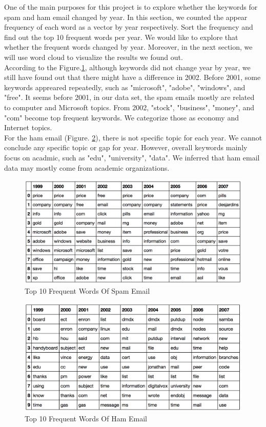 
One of the main purposes for this project is to explore whether the keywords for spam and ham email changed by year. In this section, we counted the appear frequency of each word as a vector by year respectively. Sort the frequency and find out the top 10 frequent words per year. We would like to explore that whether the frequent words changed by year. Moreover, in the next section, we will use word cloud to visualize the results we found out.\\

According to the Figure.\ref{topwordspam}, although keywords did not change year by year, we still have found out that there might have a difference in 2002. Before 2001, some keywords appreared repeatedly, such as "microsoft", "adobe", "windows", and "free". It seems before 2001, in our data set, the spam emails mostly are related to computer and Microsoft topics. From 2002, "stock", "business", "money", and  "com" become top frequent keywords. We categorize those as economy and Internet topics. \\

For the ham email (Figure. \ref{topwordham}), there is not specific topic for each year. We cannot conclude any specific topic or gap for year. However, overall keywords mainly focus on acadmic, such as "edu", "university", "data". We inferred that ham email data may mostly come from academic organizations.\\

\begin{figure}[H]
    \centering
    \includegraphics[width=13cm]{top_word_spam.png}
    \caption{Top 10 Frequent Words Of Spam Email}
    \label{topwordspam}
\end{figure}


\begin{figure}[H]
    \centering
    \includegraphics[width=13cm]{top_word_ham.png}
    \caption{Top 10 Frequent Words Of Ham Email}
    \label{topwordham}
\end{figure}



